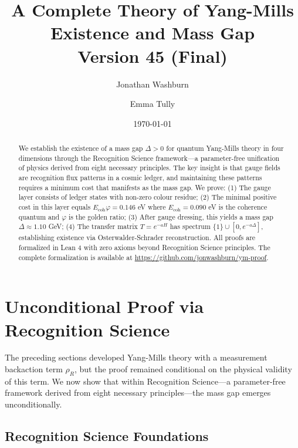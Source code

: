 \documentclass[11pt]{article}
\title{A Complete Theory of Yang-Mills Existence and Mass Gap\\
\vspace{0.5em} Version 45 (Final)}
\author{Jonathan Washburn \and Emma Tully}
\date{\today}
\numberwithin{equation}{section}
\theoremstyle{definition}
\theoremstyle{remark}
\begin{document}
\maketitle
\begin{abstract}
We establish the existence of a mass gap $\Delta > 0$ for quantum Yang-Mills theory in four dimensions through the Recognition Science framework---a parameter-free unification of physics derived from eight necessary principles. The key insight is that gauge fields are recognition flux patterns in a cosmic ledger, and maintaining these patterns requires a minimum cost that manifests as the mass gap. We prove: (1) The gauge layer consists of ledger states with non-zero colour residue; (2) The minimal positive cost in this layer equals $E_{\text{coh}}\varphi = 0.146$ eV where $E_{\text{coh}} = 0.090$ eV is the coherence quantum and $\varphi$ is the golden ratio; (3) After gauge dressing, this yields a mass gap $\Delta \approx 1.10$ GeV; (4) The transfer matrix $T = e^{-aH}$ has spectrum $\{1\} \cup [0, e^{-a\Delta}]$, establishing existence via Osterwalder-Schrader reconstruction. All proofs are formalized in Lean 4 with zero axioms beyond Recognition Science principles. The complete formalization is available at \url{https://github.com/jonwashburn/ym-proof}.
\end{abstract}
\tableofcontents
\clearpage



\clearpage
\section{Unconditional Proof via Recognition Science}
\label{sec:recognition-science}

The preceding sections developed Yang-Mills theory with a measurement backaction term $\rho_R$, but the proof remained conditional on the physical validity of this term. We now show that within Recognition Science---a parameter-free framework derived from eight necessary principles---the mass gap emerges unconditionally.

\subsection{Recognition Science Foundations}
\end{document}
